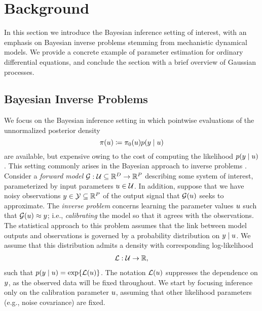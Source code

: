 \documentclass[12pt]{article}
\begin{document}
\section{Background} \label{sec:background}
In this section we introduce the Bayesian inference setting of interest, with an emphasis on Bayesian inverse problems
stemming from mechanistic dynamical models. We provide a concrete example of parameter estimation for ordinary 
differential equations, and conclude the section with a brief overview of Gaussian processes.
 
 \subsection{Bayesian Inverse Problems}
We focus on the Bayesian inference setting in which pointwise evaluations of the unnormalized posterior
density 
\begin{equation}
\pi(u) \coloneqq \pi_0(u) p(y \mid u) \label{post_dens_generic}
\end{equation}
are available, but expensive owing to the cost of computing the likelihood $p(y \mid u)$. This setting 
commonly arises in the Bayesian approach to inverse problems \citep{Stuart_BIP}. 
Consider a \textit{forward model} $\mathcal{G}: \mathcal{U} \subseteq \mathbb{R}^{D} \to \mathbb{R}^{P}$ describing 
some system of interest, parameterized by input parameters $u \in \mathcal{U}$. In addition, suppose that 
we have noisy observations $y \in \mathcal{Y} \subseteq \mathbb{R}^{P}$ of the output signal that $\mathcal{G}(u)$ 
seeks to approximate. The \textit{inverse problem} concerns learning the parameter values $u$ such
 that $\mathcal{G}(u) \approx y$; i.e., \textit{calibrating} the model so that it agrees with the observations. 
 The statistical approach to this problem assumes that the link between model outputs and 
observations is governed by a probability distribution on $y \mid u$. We assume that this distribution 
admits a density with corresponding log-likelihood 
\begin{align}
\mathcal{L}: \mathcal{U} \to \mathbb{R}, \label{log_likelihood}
\end{align}
such that $p(y \mid u) = \exp\mathopen{}\left\{\mathcal{L}(u)\right\}\mathclose{}$. The notation $\mathcal{L}(u)$ suppresses the dependence 
on $y$, as the observed data will be fixed throughout. We start by focusing inference only on the 
calibration parameter $u$, assuming that other likelihood parameters (e.g., noise covariance) 
are fixed.
\end{document}
